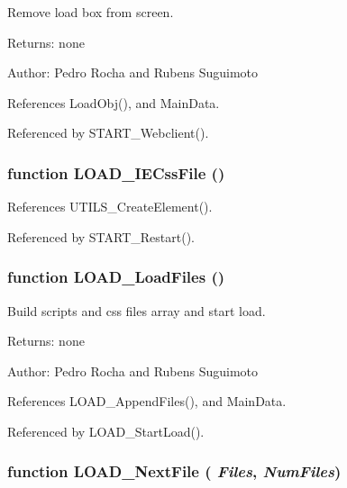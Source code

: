 Remove load box from screen. 

\begin{Desc}
\item[Returns:]none \end{Desc}
\begin{Desc}
\item[Author:]Pedro Rocha and Rubens Suguimoto \end{Desc}


References LoadObj(), and MainData.

Referenced by START\_\-Webclient().
\subsubsection[LOAD\_\-IECssFile]{\setlength{\rightskip}{0pt plus 5cm}function LOAD\_\-IECssFile ()}\label{load_2load_8js_32c656c8015b2f4b8c03c01eecf30b19}




References UTILS\_\-CreateElement().

Referenced by START\_\-Restart().
\subsubsection[LOAD\_\-LoadFiles]{\setlength{\rightskip}{0pt plus 5cm}function LOAD\_\-LoadFiles ()}\label{load_2load_8js_02636ae85af611273d71f83f93afe000}


Build scripts and css files array and start load. 

\begin{Desc}
\item[Returns:]none \end{Desc}
\begin{Desc}
\item[Author:]Pedro Rocha and Rubens Suguimoto \end{Desc}


References LOAD\_\-AppendFiles(), and MainData.

Referenced by LOAD\_\-StartLoad().
\subsubsection[LOAD\_\-NextFile]{\setlength{\rightskip}{0pt plus 5cm}function LOAD\_\-NextFile ( {\em Files}, \/   {\em NumFiles})}\label{load_2load_8js_5d91561a1bbe579986474eef9be76a98}




